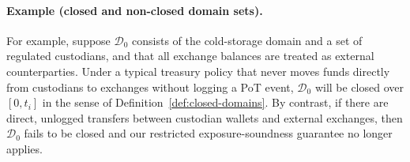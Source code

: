 \documentclass[11pt]{article}
\begin{document}
\paragraph{Example (closed and non-closed domain sets).}
For example, suppose $\mathcal{D}_0$ consists of the cold-storage domain and a set of regulated custodians, and that all exchange balances are treated as external counterparties.
Under a typical treasury policy that never moves funds directly from custodians to exchanges without logging a PoT event, $\mathcal{D}_0$ will be closed over $[0,t_i]$ in the sense of Definition~\ref{def:closed-domains}.
By contrast, if there are direct, unlogged transfers between custodian wallets and external exchanges, then $\mathcal{D}_0$ fails to be closed and our restricted exposure-soundness guarantee no longer applies.
\end{document}
